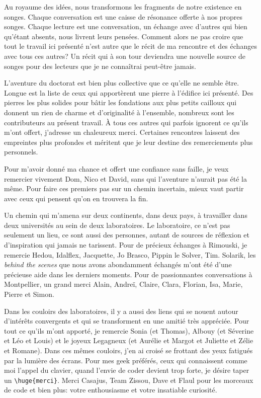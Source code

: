 Au royaume des idées, nous transformons les fragments de notre existence
en songes. Chaque conversation est une caisse de résonance offerte à nos
propres songes. Chaque lecture est une conversation, un échange avec
d'autres qui bien qu'étant absents, nous livrent leurs pensées. Comment
alors ne pas croire que tout le travail ici présenté n'est autre que le
récit de ma rencontre et des échanges avec tous ces autres? Un récit qui
à son tour deviendra une nouvelle source de songes pour des lecteurs que
je ne connaîtrai peut-être jamais.

L'aventure du doctorat est bien plus collective que ce qu'elle ne semble
être. Longue est la liste de ceux qui apportèrent une pierre à l'édifice
ici présenté. Des pierres les plus solides pour bâtir les fondations aux
plus petits cailloux qui donnent un rien de charme et d'originalité à
l'ensemble, nombreux sont les contributeurs au présent travail. À tous
ces autres qui parfois ignorent ce qu'ils m'ont offert, j'adresse un
chaleureux merci. Certaines rencontres laissent des empreintes plus
profondes et méritent que je leur destine des remerciements plus
personnels.

Pour m'avoir donné ma chance et offert une confiance sans faille, je
veux remercier vivement Dom, Nico et David, sans qui l'aventure n'aurait
pas été la même. Pour faire ces premiers pas sur un chemin incertain,
mieux vaut partir avec ceux qui pensent qu'on en trouvera la fin.

Un chemin qui m'amena sur deux continents, dans deux pays, à travailler
dans deux universités au sein de deux laboratoires. Le laboratoire, ce
n'est pas seulement un lieu, ce sont aussi des personnes, autant de
sources de réflexion et d'inspiration qui jamais ne tarissent. Pour de
précieux échanges à Rimouski, je remercie Hedou, Idalflex, Jacquette, Jo
Brasco, Pippin le Solver, Tim. Solarik, les \emph{behind the scenes} que
nous avons abondamment échangés m'ont été d'une précieuse aide dans les
derniers moments. Pour de passionnantes conversations à Montpellier, un
grand merci Alain, Andreï, Claire, Clara, Florian, Isa, Marie, Pierre et
Simon.

Dans les couloirs des laboratoires, il y a aussi des liens qui se nouent
autour d'intérêts convergents et qui se transforment en une amitié très
appréciée. Pour tout ce qu'ils m'ont apporté, je remercie Sonia (et
Thomas), Albouy (et Séverine et Léo et Louis) et le joyeux Legagneux (et
Aurélie et Margot et Juliette et Zélie et Romane). Dans ces mêmes
couloirs, j'en ai croisé se frottant des yeux fatigués par la lumière
des écrans. Pour mes geek préférés, ceux qui connaissent comme moi
l'appel du clavier, quand l'envie de coder devient trop forte, je désire
taper un \texttt{\textbackslash{}huge\{merci\}}. Merci Casajus, Team
Zissou, Dave et Flaul pour les morceaux de code et bien plus: votre
enthousiasme et votre insatiable curiosité.

